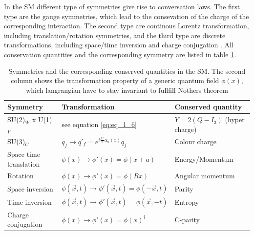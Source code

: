 In the \gls{SM} different type of symmetries give rise to conversation laws. The first type are the gauge symmetries, which lead to the consevation of the charge of the corresponding interaction. The second type are continous Lorentz transformation, including translation/rotation symmetries, and the third type are discrete transformations, including space/time inversion and charge conjugation \cite{Peskin}. All conservation quantities and the corresponding symmetry are listed in table \ref{tab:tab_1_1}.

\begin{table}[h]
	\centering
	\caption[Symmetries in the Standard Model]{Symmetries and the corresponding conserved quantities in the \gls{SM}. The second column shows the transformation property of a generic quantum field $\phi(x)$, which langrangian have to stay invariant to fullfill Nothers theorem}
	\label{tab:tab_1_1}

	\begin{tabular}{l|l|l}
		Symmetry					&Transformation										&Conserved quantity			\\ \hline
			
		SU(2)$_{W}$ x U(1)$_{Y}$			&see equation \ref{eq:eq_1_6}								&$Y = 2(Q - I_{3})$ (hyper charge)	\\ \hline
		
		SU(3)$_{C}$					&$q_{f} \rightarrow q'_{f} = e^{i\frac{\lambda^{a}}{2}\alpha_{a}(x)} q_{f}$		&Colour charge				\\ \hline \hline

		Space time translation 				&$\phi(x) \rightarrow \phi'(x) = \phi(x + a)$						&Energy/Momentum			\\ \hline

		Rotation					&$\phi(x) \rightarrow \phi'(x) = \phi(Rx)$						&Angular momentum			\\ \hline \hline

		Space inversion					&$\phi(\vec{x}, t) \rightarrow \phi'(\vec{x}, t) = \phi(-\vec{x}, t)$			&Parity					\\ \hline
		
		Time inversion					&$\phi(\vec{x}, t) \rightarrow \phi'(\vec{x}, t) = \phi(\vec{x}, -t)$	 		&Entropy				\\ \hline

		Charge conjugation				&$\phi(x) \rightarrow \phi'(x) = \phi(x)^{\dagger}$					&C-parity				
	\end{tabular}
\end{table}



